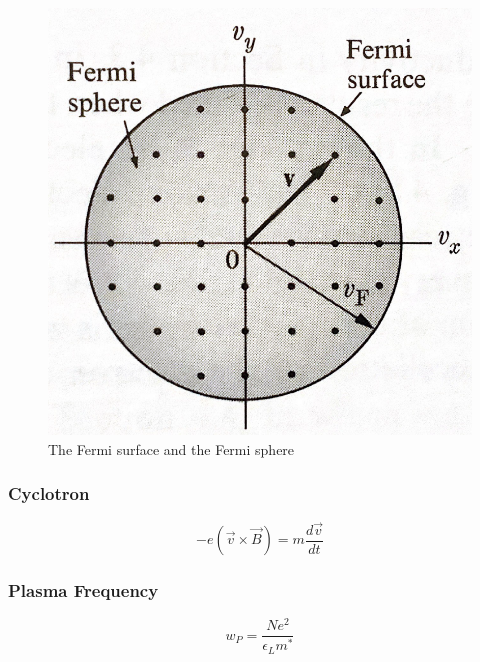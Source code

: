 \begin{figure}[H]
    \centering
    \includegraphics[width=0.4\linewidth]{Graphics/Chapter1/Fermi_Sphere.png}
    \caption{The Fermi surface and the Fermi sphere \cite[asdfadf]{elementary_SSP} }
    \label{}
\end{figure}

\subsubsection*{Cyclotron}
\begin{equation}
    -e (\vec{v} \times \vec{B}) =  m \frac{d\vec{v}}{dt}
\end{equation}

\subsubsection*{Plasma Frequency}

\begin{equation}
    w_P = \frac{Ne^2}{\epsilon_L m^*}
\end{equation}